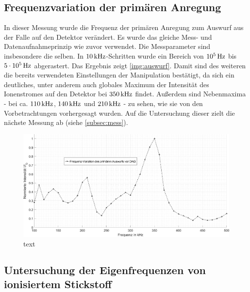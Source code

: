 \documentclass[numbers=noenddot,a4paper,notitlepage,twoside,BCOR15mm]{scrartcl}
\newcommand{\tenpo}[1]{ 10^{#1}}
\begin{document}
		\subsection{Frequenzvariation der primären Anregung}

			In dieser Messung wurde die Frequenz der primären Anregung zum Auswurf aus der Falle auf den Detektor verändert. Es wurde das gleiche Mess- und Datenaufnahmeprinzip wie zuvor verwendet. Die Messparameter sind insbesondere die selben. In $\unit[10]{kHz}$-Schritten wurde ein Bereich von $\unit[\tenpo{5}]{Hz}$ bis $\unit[5\cdot\tenpo{5}]{Hz}$ abgerastert. Das Ergebnis zeigt \autoref{img:auswurf}. Damit sind des weiteren die bereits verwendeten Einstellungen der Manipulation bestätigt, da sich ein deutliches, unter anderem auch globales Maximum der Intensität des Ionenstromes auf den Detektor bei $\unit[350]{kHz}$ findet. Außerdem sind Nebenmaxima - bei ca. $\unit[110]{kHz}$, $\unit[140]{kHz}$ und $\unit[210]{kHz}$ - zu sehen, wie sie von den Vorbetrachtungen vorhergesagt wurden. Auf die Untersuchung dieser zielt die nächste Messung ab (siehe \autoref{subsec:mess}).

				\begin{figure}[h]
					\includegraphics[width=\textwidth]{freq_auswurf.png}
					\caption{text}\label{img:auswurf}
				\end{figure}

		\subsection{Untersuchung der Eigenfrequenzen von ionisiertem Stickstoff}\label{subsec:mess}
\end{document}
